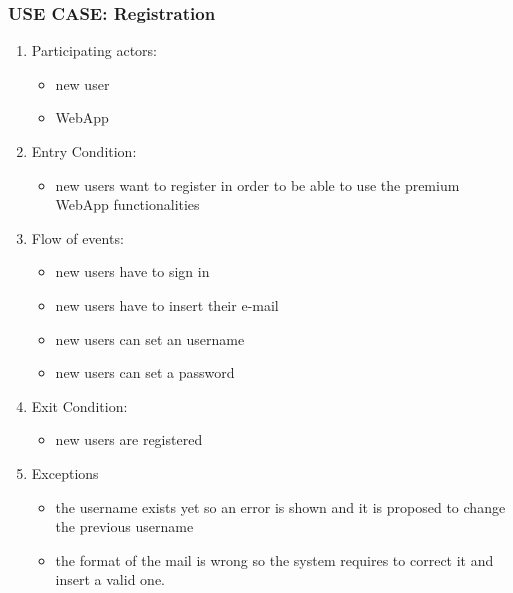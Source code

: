\documentclass{article}
\begin{document}
\subsubsection{\textbf{USE CASE}: Registration}
\begin{enumerate}
\item Participating actors: 
\begin{itemize}
    \item new user
    \item WebApp
\end{itemize}
\item Entry Condition: 
\begin{itemize}
    \item new users want to register in order to be able to use the premium WebApp functionalities
\end{itemize}
\item Flow of events: 
\begin{itemize}
    \item new users have to sign in
    \item new users have to insert their e-mail
    \item new users can set an username
    \item new users can set a password
\end{itemize}
\item Exit Condition: 
\begin{itemize}
    \item new users are registered
\end{itemize}
\item Exceptions
\begin{itemize}
    \item the username exists yet so an error is shown and it is proposed to change the previous username
    \item the format of the mail is wrong so the system requires to correct it and insert a valid one.
\end{itemize}
\end{enumerate}
\end{document}
